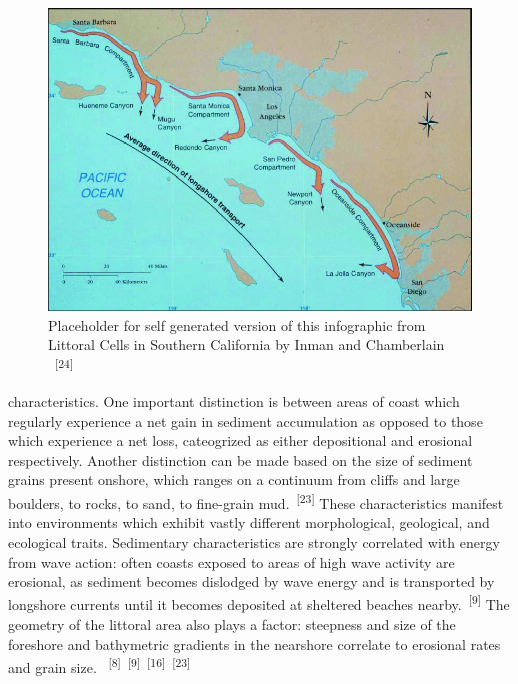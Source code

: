 \documentclass{article}
\begin{document}
\newpage
{}
\fancyfoot[C]{\thepage} 
\thispagestyle{fancy}

\begin{figure}
    \centering
    \includegraphics[width=.9\linewidth]{images/so-cal-littoral-cells.png}
    \caption{Placeholder for self generated version of this infographic from Littoral Cells in Southern California by Inman and Chamberlain ~\textsuperscript{[24]}}
    \label{figure6}
\end{figure}

\par{\noindent characteristics. One important distinction is between areas of coast which regularly experience a net gain in sediment accumulation as opposed to those which experience a net loss, cateogrized as either depositional and erosional respectively. Another distinction can be made based on the size of sediment grains present onshore, which ranges on a continuum from cliffs and large boulders, to rocks, to sand, to fine-grain mud.~\textsuperscript{[23]} These characteristics manifest into environments which exhibit vastly different morphological, geological, and ecological traits. Sedimentary characteristics are strongly correlated with energy from wave action: often coasts exposed to areas of high wave activity are erosional, as sediment becomes dislodged by wave energy and is transported by longshore currents until it becomes deposited at sheltered beaches nearby.~\textsuperscript{[9]} The geometry of the littoral area also plays a factor: steepness and size of the foreshore and bathymetric gradients in the nearshore correlate to erosional rates and grain size. ~\textsuperscript{[8]}~\textsuperscript{[9]}~\textsuperscript{[16]}~\textsuperscript{[23]}}
\end{document}
